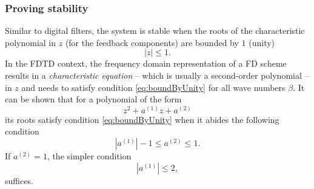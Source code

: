 {{\subsubsection{Proving stability}
Similar to digital filters, the system is stable when the roots of the characteristic polynomial in $z$ (for the feedback components) are bounded by $1$ (unity)
\begin{equation}\label{eq:boundByUnity}
    |z| \leq 1.
\end{equation} 
In the FDTD context, the frequency domain representation of a FD scheme results in a \textit{characteristic equation} -- which is usually a second-order polynomial -- in $z$ and needs to satisfy condition \eqref{eq:boundByUnity} for all wave numbers $\beta$.
It can be shown that for a polynomial of the form 
\begin{equation}\label{eq:polynomialForm}
    z^2 + a^{(1)}z + a^{(2)}
\end{equation} 
its roots satisfy condition \eqref{eq:boundByUnity} when it abides the following condition \cite{theBible}
\begin{equation}\label{eq:condition214}
    |a^{(1)}| - 1 \leq a^{(2)} \leq 1.
\end{equation}
If $a^{(2)} = 1$, the simpler condition
\begin{equation}\label{eq:simplerCondition215}
    |a^{(1)}|\leq 2,
\end{equation}
suffices. 

}}
